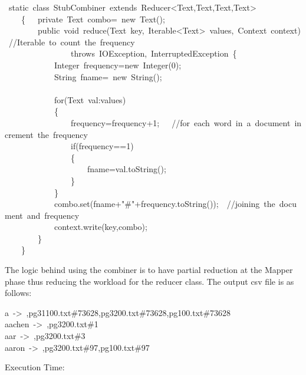 \documentclass{article}
\begin{document}
\begin{mdpre}%
~{static}~{class}~StubCombiner~{extends}~Reducer\textless{}Text,Text,Text,Text\textgreater{}\\
~~~~\{~~~{private}~Text~combo=~{new}~Text();\\
~~~~~~~~{public}~{void}~reduce(Text~key,~Iterable\textless{}Text\textgreater{}~values,~Context~context)~{//Iterable~to~count~the~frequency}\\
~~~~~~~~~~~~~~~~{throws}~IOException,~InterruptedException~\{~~~~\\
~~~~~~~~~~~~Integer~frequency={new}~Integer({0});\\
~~~~~~~~~~~~String~fname=~{new}~String();\\
~~~~~~~~~~~~\\
~~~~~~~~~~~~{for}(Text~val:values)\\
~~~~~~~~~~~~\{\\
~~~~~~~~~~~~~~~~frequency=frequency+{1};~~~{//for~each~word~in~a~document~increment~the~frequency}\\
~~~~~~~~~~~~~~~~{if}(frequency=={1})\\
~~~~~~~~~~~~~~~~\{\\
~~~~~~~~~~~~~~~~~~~~fname=val.{toString}();~~~~~~~~~~~~~~~~\\
~~~~~~~~~~~~~~~~\}~~~~\\
~~~~~~~~~~~~\}\\
~~~~~~~~~~~~combo.set(fname+{"}{\#}{"}+frequency.{toString}());~~{//joining~the~document~and~frequency}\\
~~~~~~~~~~~~context.write(key,combo);~\\
~~~~~~~~\}\\
~~~~\}%
\end{mdpre}\noindent The logic behind using the combiner is to have partial reduction at the Mapper phase thus reducing the workload for the reducer class.
The output csv file is as follows:
\begin{mdpre}%
\noindent a~-\textgreater{}~,pg31100.txt\#{73628},pg3200.txt\#{73628},pg100.txt\#{73628}\\
aachen~-\textgreater{}~,pg3200.txt\#{1}\\
aar~-\textgreater{}~,pg3200.txt\#{3}\\
aaron~-\textgreater{}~,pg3200.txt\#{97},pg100.txt\#{97}%
\end{mdpre}\noindent Execution Time:
\end{document}
